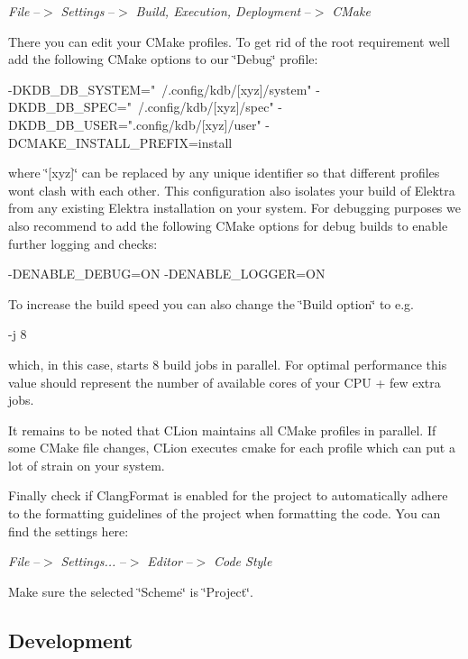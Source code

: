 {\itshape File} --$>$ {\itshape Settings} --$>$ {\itshape Build, Execution, Deployment} --$>$ {\itshape C\+Make}

There you can edit your C\+Make profiles. To get rid of the root requirement we\textquotesingle{}ll add the following C\+Make options to our \char`\"{}\+Debug\char`\"{} profile\+:


\begin{DoxyCode}
-DKDB\_DB\_SYSTEM="~/.config/kdb/[xyz]/system"
-DKDB\_DB\_SPEC="~/.config/kdb/[xyz]/spec"
-DKDB\_DB\_USER=".config/kdb/[xyz]/user"
-DCMAKE\_INSTALL\_PREFIX=install
\end{DoxyCode}


where \char`\"{}\mbox{[}xyz\mbox{]}\char`\"{} can be replaced by any unique identifier so that different profiles won\textquotesingle{}t clash with each other. This configuration also isolates your build of Elektra from any existing Elektra installation on your system. For debugging purposes we also recommend to add the following C\+Make options for debug builds to enable further logging and checks\+:


\begin{DoxyCode}
-DENABLE\_DEBUG=ON
-DENABLE\_LOGGER=ON
\end{DoxyCode}


To increase the build speed you can also change the \char`\"{}\+Build option\char`\"{} to e.\+g.


\begin{DoxyCode}
-j 8
\end{DoxyCode}


which, in this case, starts 8 build jobs in parallel. For optimal performance this value should represent the number of available cores of your C\+PU + few extra jobs.

It remains to be noted that C\+Lion maintains all C\+Make profiles in parallel. If some C\+Make file changes, C\+Lion executes {\ttfamily cmake} for each profile which can put a lot of strain on your system.

Finally check if {\ttfamily Clang\+Format} is enabled for the project to automatically adhere to the formatting guidelines of the project when formatting the code. You can find the settings here\+:

{\itshape File} --$>$ {\itshape Settings...} --$>$ {\itshape Editor} --$>$ {\itshape Code Style}

Make sure the selected \char`\"{}\+Scheme\char`\"{} is \char`\"{}\+Project\char`\"{}.

\subsection*{Development}

